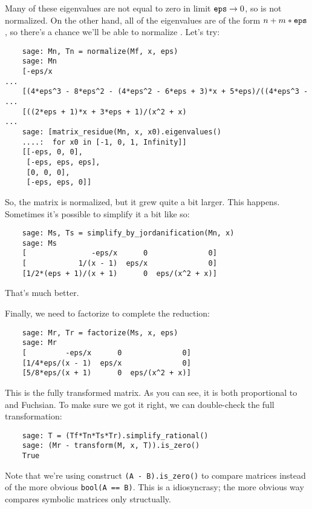 \documentclass[12pt,a4paper]{article}
\begin{document}
Many of these eigenvalues are not equal to zero in limit $\texttt{eps}\to0$, so  is not normalized.
On the other hand, all of the eigenvalues are of the form $n + m*\texttt{eps}$, so there's a chance we'll be able to normalize .
Let's try:

\begin{verbatim}
    sage: Mn, Tn = normalize(Mf, x, eps)
    sage: Mn
    [-eps/x                                                            ...
    [(4*eps^3 - 8*eps^2 - (4*eps^2 - 6*eps + 3)*x + 5*eps)/((4*eps^3 - ...
    [((2*eps + 1)*x + 3*eps + 1)/(x^2 + x)                             ...
    sage: [matrix_residue(Mn, x, x0).eigenvalues()
    ....:  for x0 in [-1, 0, 1, Infinity]]
    [[-eps, 0, 0],
     [-eps, eps, eps],
     [0, 0, 0],
     [-eps, eps, 0]]
\end{verbatim}

So, the matrix is normalized, but it grew quite a bit larger.
This happens.
Sometimes it's possible to simplify it a bit like so:

\begin{verbatim}
    sage: Ms, Ts = simplify_by_jordanification(Mn, x)
    sage: Ms
    [               -eps/x      0              0]
    [            1/(x - 1)  eps/x              0]
    [1/2*(eps + 1)/(x + 1)      0  eps/(x^2 + x)]
\end{verbatim}

That's much better.

Finally, we need to factorize  to complete the reduction:

\begin{verbatim}
    sage: Mr, Tr = factorize(Ms, x, eps)
    sage: Mr
    [         -eps/x      0              0]
    [1/4*eps/(x - 1)  eps/x              0]
    [5/8*eps/(x + 1)      0  eps/(x^2 + x)]
\end{verbatim}

This is the fully transformed matrix.
As you can see, it is both proportional to  and Fuchsian.
To make sure we got it right, we can double-check the full transformation:

\begin{verbatim}
    sage: T = (Tf*Tn*Ts*Tr).simplify_rational()
    sage: (Mr - transform(M, x, T)).is_zero()
    True
\end{verbatim}

Note that we're using construct \texttt{(A - B).is\_zero()} to compare matrices instead of the more obvious \texttt{bool(A == B)}.
This is a \sage idiosyncrasy; the more obvious way compares symbolic matrices only structually.
\end{document}
